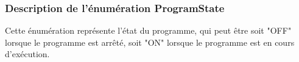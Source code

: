 \subsubsection{Description de l'énumération ProgramState}

Cette énumération représente l'état du programme, qui peut être soit "OFF" lorsque le programme est arrêté, soit "ON" lorsque le programme est en cours d'exécution.
\newline